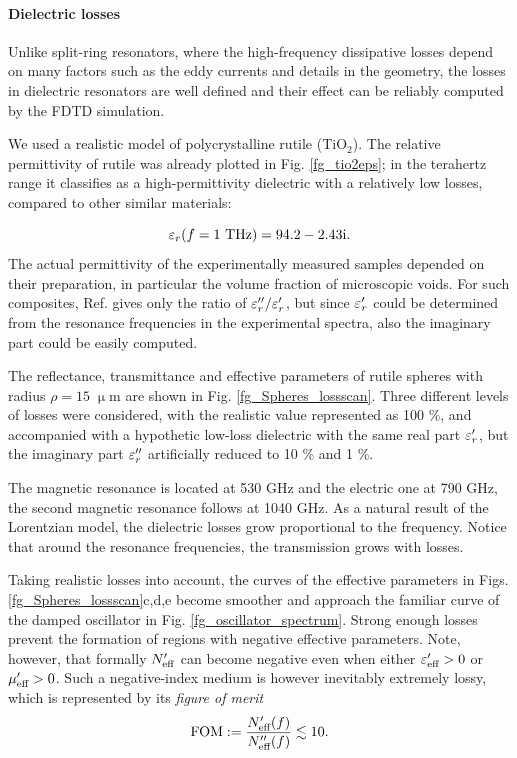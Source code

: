 \paragraph{Dielectric losses}%
Unlike split-ring resonators, where the high-frequency dissipative losses depend on many factors such as the eddy currents and details in the geometry, the losses in dielectric resonators are well defined and their effect can be reliably computed by the FDTD simulation. 

We used a realistic model \cite{baumard1977_epsilon_TiO2} of polycrystalline rutile (TiO$_{2}$). The relative permittivity of rutile was already plotted in Fig. \ref{fg_tio2eps}; in the terahertz range it classifies as a high-permittivity dielectric with a relatively low losses, compared to other similar materials:

\begin{equation}\varepsilon_r(f=1\text{ THz}) = 94.2-2.43\text{i}. \label{eq_tio2}\end{equation}
The actual permittivity of the experimentally measured samples depended on their preparation, in particular the volume fraction of microscopic voids. For such composites, Ref. \cite{baumard1977_epsilon_TiO2} gives only the ratio of $\varepsilon_r''/\varepsilon_r'$, but since $\varepsilon_r'$ could be determined from the resonance frequencies in the experimental spectra, also the imaginary part could be easily computed.

The reflectance, transmittance and effective parameters of rutile spheres with radius $\rho=15\;\upmu$m are shown in Fig. \ref{fg_Spheres_lossscan}. Three different levels of losses were considered, with the realistic value represented as 100 \%, and accompanied with a hypothetic low-loss dielectric with the same real part $\varepsilon_r'$, but the imaginary part $\varepsilon_r''$ artificially reduced to  10 \% and 1 \%. 

The magnetic resonance is located at 530 GHz and the electric one at 790 GHz, the second magnetic resonance follows at 1040 GHz. As a natural result of the Lorentzian model, the dielectric losses grow proportional to the frequency. Notice that around the resonance frequencies, the transmission grows with losses.

Taking realistic losses into account, the curves of the effective parameters in Figs. \ref{fg_Spheres_lossscan}c,d,e become smoother and approach the familiar curve of the damped oscillator in Fig. \ref{fg_oscillator_spectrum}. Strong enough losses prevent the formation of regions with negative effective parameters. Note, however, that formally $N_{\text{eff} }'$ can become negative \cite[pp. 12--15]{pazoutova2011dp} even when either $\varepsilon_{\text{eff} }'>0$ or $\mu_{\text{eff} }'>0$. Such a negative-index medium is however inevitably extremely lossy, which is represented by its \textit{figure of merit}
\begin{equation} \text{FOM} := \frac{N_{\text{eff} }'(f)}{N_{\text{eff} }''(f)} \lesssim 10. \label{eq_fom}\end{equation}

